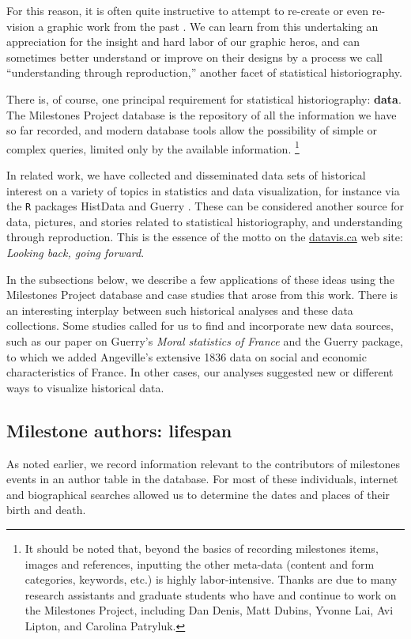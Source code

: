 For this reason, it is often quite instructive to attempt to re-create or even re-vision a graphic work from the past \citep{Friendly:02:Minard}. We can learn from this undertaking an appreciation for the insight and hard labor of our graphic heros, and can sometimes better understand or improve on their designs by a process we call ``understanding through reproduction,'' another facet of statistical historiography.

There is, of course,  one principal requirement for statistical historiography: \textbf{data}. The Milestones Project database is the repository of all the information we have so far recorded, and modern database tools allow the possibility of simple or complex queries, limited only by the available information.%
\footnote{It should be noted that, beyond the basics of recording milestones items, images and references, inputting the other meta-data (content and form categories, keywords, etc.) is highly labor-intensive. Thanks are due to many research assistants and graduate students who have and continue to work on the Milestones Project, including Dan Denis, Matt Dubins, Yvonne Lai, Avi Lipton, and Carolina Patryluk.}

In related work, we have collected and disseminated data sets of historical interest on a variety of topics in statistics and data visualization, for instance via the \texttt{R} packages HistData \citep{HistData} and Guerry \citep{Guerry}. These can be considered another source for data, pictures, and stories related to statistical historiography, and understanding through reproduction. This is the essence of the motto on the \url{datavis.ca} web site: \emph{Looking back, going forward}.

In the subsections below, we describe a few applications of these ideas using the Milestones Project database and case studies that arose from this work. There is an interesting interplay between such historical analyses and these data collections. Some studies called for us to find and incorporate new data sources, such as our paper \citep{Friendly:2007:guerry} on Guerry's \emph{Moral statistics of France} and the Guerry package, to which we added Angeville's extensive 1836 data on social and economic characteristics of France. In other cases, our analyses suggested new or different ways to visualize historical data.

\subsection{Milestone authors: lifespan}\label{sec:lifespan}
As noted earlier, we record information relevant to the contributors of milestones events in an author table in the database. For most of these individuals, internet and biographical searches allowed us to determine the dates and places of their birth and death.

